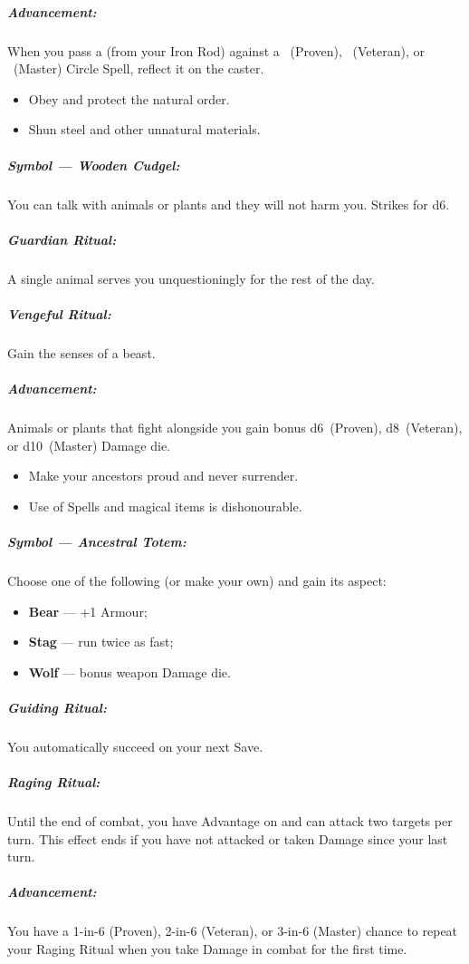\documentclass[itdr]{subfiles}
\begin{document}
\subparagraph{Advancement:} When you pass a  (from your Iron Rod) against a ~(Proven), ~(Veteran), or ~(Master) Circle Spell, reflect it on the caster.

\vfill

{\em\begin{itemize}
		\item Obey and protect the natural order.
		\item Shun steel and other unnatural materials.
\end{itemize}}

\subparagraph{Symbol --- Wooden Cudgel:} You can talk with animals or plants and they will not harm you. Strikes for d6.

\subparagraph{Guardian Ritual:} A single animal serves you unquestioningly for the rest of the day.

\subparagraph{Vengeful Ritual:} Gain the senses of a beast.

\subparagraph{Advancement:} Animals or plants that fight alongside you gain bonus d6~(Proven), d8~(Veteran), or d10~(Master) Damage die.

\vfill

{\em\begin{itemize}
		\item Make your ancestors proud and never surrender.
		\item Use of Spells and magical items is dishonourable.
\end{itemize}}

\subparagraph{Symbol --- Ancestral Totem:} Choose one of the following (or make your own) and gain its aspect:
\begin{itemize}
	\item \textbf{Bear} --- +1 Armour;
	\item \textbf{Stag} --- run twice as fast;
	\item \textbf{Wolf} --- bonus weapon Damage die.
\end{itemize}

\subparagraph{Guiding Ritual:} You automatically succeed on your next Save.

\subparagraph{Raging Ritual:} Until the end of combat, you have Advantage on  and can attack two targets per turn. This effect ends if you have not attacked or taken Damage since your last turn.

\subparagraph{Advancement:} You have a 1-in-6 (Proven), 2-in-6 (Veteran), or 3-in-6 (Master) chance to repeat your Raging Ritual when you take Damage in combat for the first time.
\end{document}
